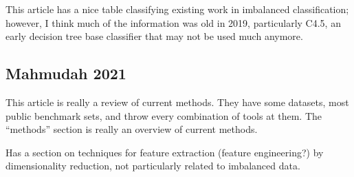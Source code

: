 This article \cite{CHABBOUH_2019} has a nice table classifying existing work in imbalanced classification; however, I think much of the information was old in 2019, particularly C4.5, an early decision tree base classifier that may not be used much anymore.  


\subsection{Mahmudah 2021}

This article \cite{MAHMUDAH_2021} is really a review of current methods.   They have some datasets, most public benchmark sets, and throw every combination of tools at them. The ``methods'' section is really an overview of current methods.  

Has a section on techniques for feature extraction (feature engineering?) by dimensionality reduction, not particularly related to imbalanced data.  



